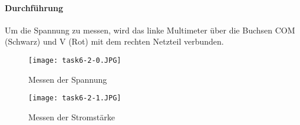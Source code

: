 \paragraph{Durchführung}
Um die Spannung zu messen, wird das linke Multimeter über die Buchsen COM (Schwarz) und V (Rot) mit dem rechten Netzteil verbunden.

\begin{figure}
	\begin{minipage}[c]{0.49\textwidth}
		\texttt{[image: task6-2-0.JPG]}
		\caption{Messen der Spannung}
		\label{task6-2-0}
	\end{minipage}
	\begin{minipage}[c]{0.49\textwidth}
		\texttt{[image: task6-2-1.JPG]}
		\caption{Messen der Stromstärke}
		\label{task6-2-1}
	\end{minipage}
\end{figure}